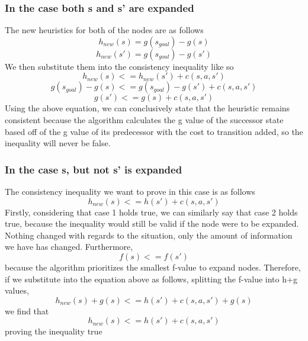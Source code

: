 \documentclass{article}
\begin{document}
\subsubsection{In the case both s and s' are expanded}
The new heuristics for both of the nodes are as follows
\begin{equation}
h_{new}(s) = g(s_{goal})-g(s)
\end{equation}
\begin{equation}
h_{new}(s') = g(s_{goal})-g(s')
\end{equation}
We then substitute them into the consistency inequality like so
\begin{equation}
h_{new}(s) <= h_{new}(s')+c(s,a,s')
\end{equation}
\begin{equation}
g(s_{goal}) - g(s) <= g(s_{goal}) - g(s') + c(s,a,s')
\end{equation}
\begin{equation}
g(s') <= g(s) + c(s,a,s')
\end{equation}
Using the above equation, we can conclusively state that the heuristic remains consistent because the algorithm calculates the g value of the successor state based off of the g value of its predecessor with the cost to transition added, so the inequality will never be false.
\subsubsection{In the case s, but not s' is expanded}
The consistency inequality we want to prove in this case is as follows
\begin{equation}
h_{new}(s) <= h(s') + c(s,a,s')
\end{equation}
Firstly, considering that case 1 holds true, we can similarly say that case 2 holds true, because the inequality would still be valid if the node were to be expanded. Nothing changed with regards to the situation, only the amount of information we have has changed. 
Furthermore,
\begin{equation}
f(s) <= f(s')
\end{equation}
because the algorithm prioritizes the smallest f-value to expand nodes. Therefore, if we substitute into the equation above as follows, splitting the f-value into h+g values,
\begin{equation}
	h_{new}(s) + g(s) <= h(s') + c(s,a,s') + g(s)
\end{equation}
we find that 
\begin{equation}
h_{new}(s) <= h(s') + c(s,a,s')
\end{equation}
proving the inequality true
\end{document}

